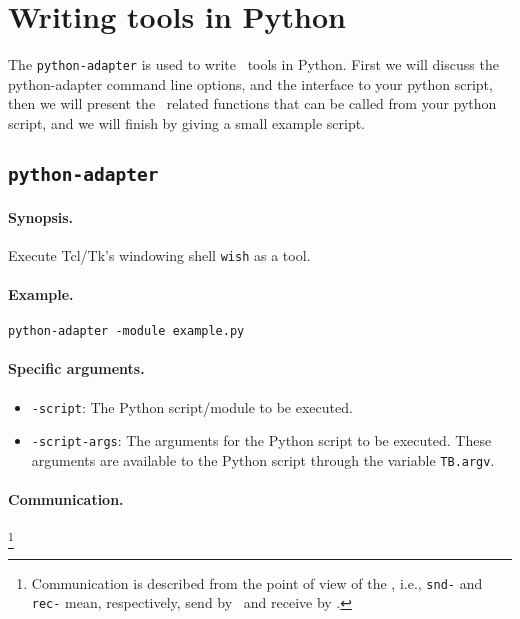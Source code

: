 
\section{\label{ToolInPython}Writing tools in Python}

The {\tt python-adapter} is used to write \TB\ tools in Python.
First we will discuss the python-adapter command line options, and
the interface to your python script,
then we will present the \TB\ related functions that can be called
from your python script, and we will finish by giving a small example
script.

\subsection{\label{python-adapter}{\tt python-adapter}}

\paragraph{Synopsis.} Execute Tcl/Tk's windowing shell {\tt wish} as a tool.

\paragraph{Example.} {\tt python-adapter -module example.py}

\paragraph{Specific arguments.}
\begin{itemize}
\item {\tt -script}: The Python script/module to be executed.
\item {\tt -script-args}: The arguments for the Python script to be executed.
	These arguments are available to the Python script through the
        variable {\tt TB.argv}.
\end{itemize}

\paragraph{Communication.} \hspace{-0.3cm}\footnote{Communication is described
from the point of view of the \TB, i.e., {\tt snd-} and {\tt rec-}
mean, respectively, send by \TB\ and receive by \TB.}

